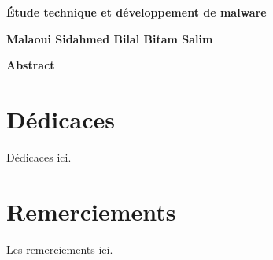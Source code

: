         
        
        


\thispagestyle{plain}
\begin{center}
    \Large
    \textbf{Étude technique et développement de malware}
    
    \vspace{0.4cm}
    \large
    
    \vspace{0.4cm}
    \textbf{Malaoui Sidahmed Bilal \hspace{3cm} Bitam Salim}
    
    \vspace{0.9cm}
    \textbf{Abstract}
\end{center}

\chapter*{Dédicaces}
Dédicaces ici.

\chapter*{Remerciements}
Les remerciements ici.